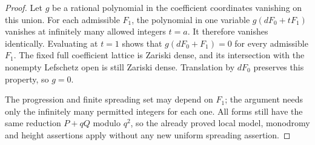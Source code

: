 \begin{proof}
Let $g$ be a rational polynomial in the coefficient
coordinates vanishing on this union.  For each admissible
$F_1$, the polynomial in one variable
$g(dF_0+tF_1)$ vanishes at infinitely many allowed integers
$t=a$.  It therefore vanishes identically.  Evaluating
at $t=1$ shows that $g(dF_0+F_1)=0$ for every admissible
$F_1$.  The fixed full coefficient lattice is Zariski
dense, and its intersection with the nonempty Lefschetz
open is still Zariski dense.  Translation by $dF_0$
preserves this property, so $g=0$.

The progression and finite spreading set may depend on
$F_1$; the argument needs only the infinitely many
permitted integers for each one.  All forms still have
the same reduction $P+qQ$ modulo $q^2$, so the already
proved local model, monodromy and height assertions
apply without any new uniform spreading assertion.
\end{proof}
